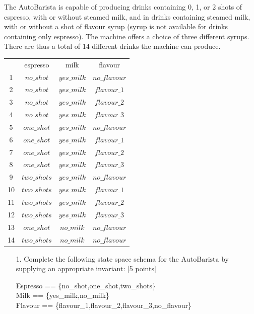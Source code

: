 \documentclass[12pt,fleqn]{article}
\begin{document}
\begin{enumerate}
The AutoBarista is capable of producing drinks containing 0, 1, or 2 shots of espresso, with or without steamed milk, and in drinks containing steamed milk, with or without a shot of flavour syrup (syrup is not available for drinks containing only espresso). The machine offers a choice of three different syrups. There are thus a total of 14 different drinks the machine can produce. \\
\begin{center}
  \color{blue}
\begin{tabular}{ c c c c}
       & espresso & milk & flavour \\ 
 1     & $no\_shot$ & $yes\_milk$ & $no\_flavour$ \\  
 2     & $no\_shot$ & $yes\_milk$ & $flavour\_1$ \\
 3     & $no\_shot$ & $yes\_milk$ & $flavour\_2$ \\
 4     & $no\_shot$ & $yes\_milk$ & $flavour\_3$ \\
 5     & $one\_shot$ & $yes\_milk$ & $no\_flavour$ \\  
 6     & $one\_shot$ & $yes\_milk$ & $flavour\_1$ \\
 7     & $one\_shot$ & $yes\_milk$ & $flavour\_2$ \\
 8     & $one\_shot$ & $yes\_milk$ & $flavour\_3$ \\
 9     & $two\_shots$ & $yes\_milk$ & $no\_flavour$ \\  
 10    & $two\_shots$ & $yes\_milk$ & $flavour\_1$ \\
 11    & $two\_shots$ & $yes\_milk$ & $flavour\_2$ \\
 12    & $two\_shots$ & $yes\_milk$ & $flavour\_3$ \\
 13    & $one\_shot$ & $no\_milk$  & $no\_flavour$ \\
 14    & $two\_shots$ & $no\_milk$ & $no\_flavour$ \\
 \end{tabular}
\end{center}

\begin{enumerate}
\item[1.] Complete the following state space schema for the $\mathrm{AutoBarista}$ by supplying an appropriate invariant: [5 points]

\begin{zed}
Espresso == \{no\_shot,one\_shot,two\_shots\}\\
Milk == \{yes\_milk,no\_milk\}\\
Flavour == \{flavour\_1,flavour\_2,flavour\_3,no\_flavour\}
\end{zed}


\end{enumerate}
\end{enumerate}
\end{document}
